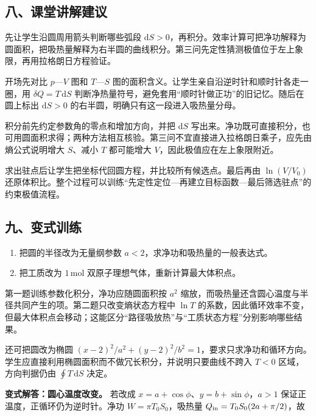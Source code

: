 \documentclass[12pt,a4paper,UTF8]{ctexart}
\newcommand{\tightlist}{\setlength{\itemsep}{0pt}\setlength{\parskip}{0pt}}
\begin{document}
\subsection{八、课堂讲解建议}\label{ux516bux8bfeux5802ux8bb2ux89e3ux5efaux8bae-6}

先让学生沿圆周用箭头判断哪些弧段
\(\mathrm dS>0\)，再积分。效率计算可把净功解释为圆面积，把吸热量解释为右半圆的曲线积分。第三问先定性猜测极值位于左上象限，再用拉格朗日方程验证。

开场先对比 \(p\)---\(V\) 图和 \(T\)---\(S\)
图的面积含义。让学生亲自沿逆时针和顺时针各走一圈，用
\(\delta Q=T\,\mathrm dS\)
判断净热量符号，避免套用``顺时针做正功''的旧记忆。随后在圆上标出
\(\mathrm dS>0\) 的右半圆，明确只有这一段进入吸热量分母。

积分前先约定参数角的零点和增加方向，并把 \(\mathrm dS\)
写出来。净功既可直接积分，也可用圆面积求得；两种方法相互核验。第三问不宜直接进入拉格朗日乘子，应先由熵公式说明增大
\(S\)、减小 \(T\) 都可能增大 \(V\)，因此极值应在左上象限附近。

求出驻点后让学生把坐标代回圆方程，并比较所有候选点。最后再由
\(\ln(V/V_0)\)
还原体积比。整个过程可以训练``先定性定位---再建立目标函数---最后筛选驻点''的约束极值流程。

\subsection{九、变式训练}\label{ux4e5dux53d8ux5f0fux8badux7ec3-6}

\begin{enumerate}
\def\labelenumi{\arabic{enumi}.}
\tightlist
\item
  把圆的半径改为无量纲参数 \(a<2\)，求净功和吸热量的一般表达式。
\item
  把工质改为 \(1\,\mathrm{mol}\) 双原子理想气体，重新计算最大体积点。
\end{enumerate}

第一题训练参数化积分，净功应随圆面积按 \(a^2\)
缩放，而吸热量还含圆心温度与半径共同产生的项。第二题只改变熵状态方程中
\(\ln T\)
的系数，因此循环效率不变，但最大体积点会移动；这能区分``路径吸放热''与``工质状态方程''分别影响哪些结果。

还可把圆改为椭圆
\((x-2)^2/a^2+(y-2)^2/b^2=1\)，要求只求净功和循环方向。学生应直接利用椭圆面积而不做冗长积分，并说明只要曲线不跨入
\(T<0\) 区域，方向判据仍由 \(\oint T\,\mathrm dS\) 决定。

\textbf{变式解答：圆心温度改变。} 若改成
\(x=a+\cos\phi\)、\(y=b+\sin\phi\)，\(a>1\)
保证正温度，正循环仍为逆时针。净功 \(W=\pi T_0S_0\)，吸热量
\(Q_{\rm in}=T_0S_0(2a+\pi/2)\)，故
\end{document}
